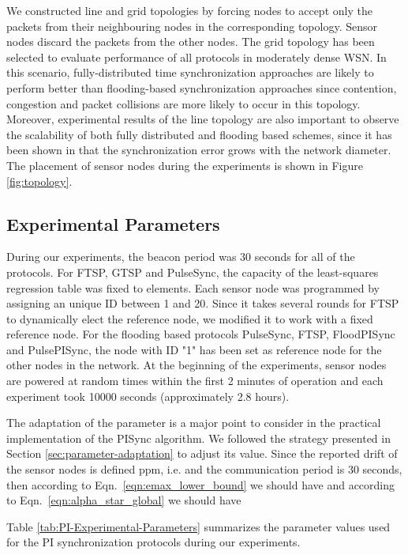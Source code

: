 \documentclass[english,a4paper,10pt,final]{article}
\numberwithin{equation}{section}
\numberwithin{figure}{section}
\begin{document}
We constructed line and grid topologies by forcing nodes to accept only the packets from their neighbouring nodes in the corresponding topology. Sensor nodes discard the packets from the other nodes. The grid topology has been selected to evaluate performance of all protocols in moderately dense WSN. In this scenario, fully-distributed time synchronization approaches are likely to perform better than flooding-based synchronization approaches since contention, congestion and packet collisions are more likely to occur in this topology. Moreover, experimental results of the line topology are also important to observe the scalability of both fully distributed and flooding based schemes, since it has been shown in \cite{Lenzen2009Optimal} that the synchronization error grows with the network diameter. The placement of sensor nodes during the experiments is shown in Figure \ref{fig:topology}.





\subsection{Experimental Parameters}

During our experiments, the beacon period  was 30 seconds for all of the protocols. For FTSP, GTSP and PulseSync, the capacity of the least-squares regression table was fixed to  elements. Each sensor node was programmed by assigning an unique ID between 1 and 20. Since it takes several rounds for FTSP to dynamically elect the reference node, we modified it to work with a fixed reference node. For the flooding based protocols PulseSync, FTSP, FloodPISync and PulsePISync, the node with ID "1" has been set as reference node for the other nodes in the network. At the beginning of the experiments, sensor nodes are powered at random times within the first 2 minutes of operation and each experiment took 10000 seconds (approximately 2.8 hours).

The adaptation of the  parameter is a major point to consider in the practical implementation of the PISync algorithm. We followed the strategy presented in Section \ref{sec:parameter-adaptation} to adjust its value. Since the reported drift of the sensor nodes is defined  ppm, i.e.  and the communication period  is 30 seconds, then according to  Eqn.~\eqref{eqn:emax_lower_bound} we should have  and according to Eqn.~\eqref{eqn:alpha_star_global} we should have

Table \ref{tab:PI-Experimental-Parameters} summarizes the parameter values used for the PI synchronization protocols during our experiments.
\end{document}
